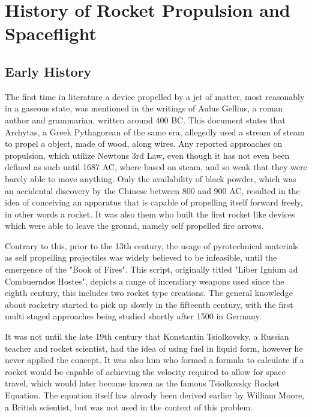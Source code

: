 \section{History of Rocket Propulsion and Spaceflight}
\author{Sebastian Schaffler}

\subsection{Early History}
The first time in literature a device propelled by a jet of matter, most reasonably in a gaseous state, was mentioned in the writings of Aulus Gellius, a roman author and grammarian, written around 400 BC. This document states that Archytas, a Greek Pythagorean of the same era, allegedly used a stream of steam to propel a object, made of wood, along wires. Any reported approaches on propulsion, which utilize Newtons 3rd Law, even though it has not even been defined as such until 1687 AC, where based on steam, and so weak that they were barely able to move anything. Only the availability of black powder, which was an accidental discovery by the Chinese between 800 and 900 AC, resulted in the idea of conceiving an apparatus that is capable of propelling itself forward freely, in other words a rocket. It was also them who built the first rocket like devices which were able to leave the ground, namely self propelled fire arrows.

Contrary to this, prior to the 13th century, the usage of pyrotechnical materials as self propelling projectiles was  widely believed to be infeasible, until the emergence of the "Book of Fires". This script, originally titled "Liber Ignium ad Combuerndos Hostes", depicts a range of incendiary weapons used since the eighth century, this includes two rocket type creations. The general knowledge about rocketry started to pick up slowly in the fifteenth century, with the first multi staged approaches being studied shortly after 1500 in Germany.

It was not until the late 19th century that Konstantin Tsiolkovsky, a Russian teacher and rocket scientist, had the idea of using fuel in liquid form, however he never applied the concept. It was also him who formed a formula to calculate if a rocket would be capable of achieving the velocity required to allow for space travel, which would later become known as the famous Tsiolkovsky Rocket Equation. The equation itself has already been derived earlier by William Moore, a British scientist, but was not used in the context of this problem. 

